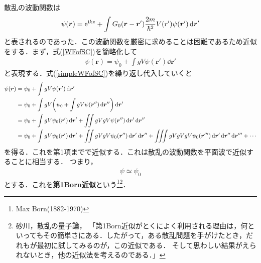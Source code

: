 \documentclass{report}
\begin{document}
 散乱の波動関数は
 \begin{align}
  \label{WFofSC}
  \psi(\bm{r}) = \mathrm{e}^{\mathrm{i} kz} + \int G_0 (\bm{r} - \bm{r}') \frac{2m}{\hbar^2} V(r') \psi(\bm{r}') \dd{\bm{r}'}
 \end{align}
 と表されるのであった．この波動関数を厳密に求めることは困難であるため近似をする．まず，式(\ref{WFofSC})を簡略化して
 \begin{align}
  \label{simpleWFofSC}
  \psi(\bm{r}) = \psi_0 + \int g V \psi(\bm{r}') \dd{\bm{r}'}
 \end{align}
 と表現する．式(\ref{simpleWFofSC})を繰り返し代入していくと
 \begin{align}
  \psi(\bm{r}) &= \psi_0 + \int g V \psi(\bm{r}') \dd{\bm{r}'}\\
  &= \psi_0 + \int gV \qty(\psi_0 + \int g V \psi(\bm{r}'') \dd{\bm{r}''}) \dd{\bm{r}'}\\
  &= \psi_0 + \int g V \psi_0(\bm{r}') \dd{\bm{r}'} + \iint gVgV \psi(\bm{r}'') \dd{\bm{r}'} \dd{\bm{r}''}\\
  &= \psi_0 + \int g V \psi_0(\bm{r}') \dd{\bm{r}'} + \iint gVgV \psi_0(\bm{r}'') \dd{\bm{r}'} \dd{\bm{r}''} + \iiint gVgVgV \psi_0(\bm{r}''') \dd{\bm{r}'} \dd{\bm{r}''} \dd{\bm{r}'''} + \cdots
 \end{align}
 を得る．これを第1項までで近似する．これは散乱の波動関数を平面波で近似することに相当する．
 つまり，
 \begin{align}
  \psi \simeq \psi_0
 \end{align}
 とする．これを\textbf{第1Born近似}という\footnote{Max Born(1882-1970)}\footnote{砂川，散乱の量子論，
 「第1Born近似がとくによく利用される理由は，何といってもその簡単さにある．したがって，ある散乱問題を手がけたとき，だれもが最初に試してみるのが，この近似である．
 そして思わしい結果がえられないとき，他の近似法を考えるのである．」}．
\end{document}
